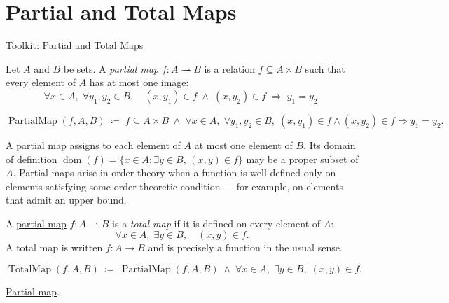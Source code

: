 
\section{Partial and Total Maps}
\label{sec:partial-total-maps}

\begin{definitionbox}{Toolkit: Partial and Total Maps}
\begin{definition}
\label{def:partial-map}
Let $A$ and $B$ be sets.  A \emph{partial map} $f : A \rightharpoonup B$
is a relation $f \subseteq A \times B$ such that every element of $A$ has
at most one image:
\[
\forall x \in A,\; \forall y_1, y_2 \in B,\quad
(x, y_1) \in f \;\land\; (x, y_2) \in f
\;\Longrightarrow\; y_1 = y_2.
\]
\end{definition}
\end{definitionbox}

\begin{remark*}
\[
\operatorname{PartialMap}(f, A, B)
\;\coloneqq\;
f \subseteq A \times B
\;\land\;
\forall x \in A,\; \forall y_1, y_2 \in B,\;
(x,y_1) \in f \land (x,y_2) \in f \Rightarrow y_1 = y_2.
\]
\end{remark*}

\begin{remark*}[Interpretation]
A partial map assigns to each element of $A$ at most one element of $B$.
Its domain of definition
$\operatorname{dom}(f) = \{x \in A : \exists y \in B,\, (x,y) \in f\}$
may be a proper subset of $A$.  Partial maps arise in order theory when
a function is well-defined only on elements satisfying some order-theoretic
condition — for example, on elements that admit an upper bound.
\end{remark*}

\NoLocalDependencies

\begin{definition}
\label{def:total-map}
A \hyperref[def:partial-map]{partial map} $f : A \rightharpoonup B$ is a
\emph{total map} if it is defined on every element of $A$:
\[
\forall x \in A,\; \exists y \in B,\quad (x, y) \in f.
\]
A total map is written $f : A \to B$ and is precisely a function in the
usual sense.
\end{definition}

\begin{remark*}
\[
\operatorname{TotalMap}(f, A, B)
\;\coloneqq\;
\operatorname{PartialMap}(f, A, B)
\;\land\;
\forall x \in A,\; \exists y \in B,\; (x, y) \in f.
\]
\end{remark*}

\begin{remark*}[Dependencies]
\hyperref[def:partial-map]{Partial map}.
\end{remark*}
